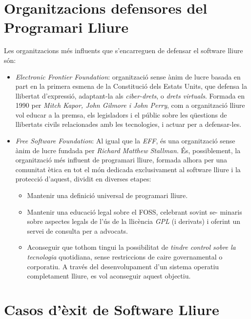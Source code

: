 \section{Organitzacions defensores del Programari Lliure}

Les organitzacions més influents que s'encarreguen de defensar el software lliure són:
 
 \begin{itemize}
\item \emph{Electronic Frontier Foundation}:  organització sense ànim de lucre basada en part en la primera esmena de la Constitució dels Estats Units, que defensa la llibertat d'expressió, adaptant-la als \emph{ciber-drets}, o \emph{drets virtuals}. Formada en 1990 per \textit{Mitch Kapor, John Gilmore i John Perry}, com a organització lliure vol educar a la premsa, els legisladors i el públic sobre les qüestions de llibertats civils relacionades amb les tecnologies, i actuar per a defensar-les. \cite{OrgDefEFF}
 \cite{OrgDefEFFII}
\item \emph{Free Software Foundation}: Al igual que la \emph{EFF}, és una 		organització sense ànim de lucre fundada per \emph{Richard Matthew Stallman}. És, possiblement, la organització més 		influent de programari lliure, formada alhora per una comunitat ètica en tot el món dedicada 		exclusivament al software lliure i la protecció d'aquest, dividit en diverses etapes:


	\begin{itemize}
	\item Mantenir una definició universal de programari lliure.
	\item Mantenir una educació legal sobre el FOSS, celebrant sovint se- minaris sobre aspectes legals de l'ús de la 		llicència \emph{GPL} (i derivats) i oferint un servei de consulta per a advocats.
	\item Aconseguir que tothom tingui la possibilitat de \emph{tindre control sobre la tecnologia} 	quotidiana, sense restriccions de caire governamental o corporatiu. A través del desenvolupament d'un sistema operatiu completament lliure, es vol aconseguir aquest objectiu. \cite{ObjGNU} \cite{OrgDefFSF}
	\end{itemize}

\end{itemize}

\section{Casos d'èxit de Software Lliure}

